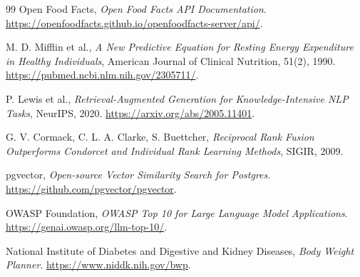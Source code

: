 \documentclass[12pt,a4paper]{report}
\begin{document}
\begin{thebibliography}{99}
Open Food Facts, \emph{Open Food Facts API Documentation}.
\url{https://openfoodfacts.github.io/openfoodfacts-server/api/}.

M. D. Mifflin et al., \emph{A New Predictive Equation for Resting Energy
Expenditure in Healthy Individuals}, American Journal of Clinical Nutrition,
51(2), 1990. \url{https://pubmed.ncbi.nlm.nih.gov/2305711/}.

P. Lewis et al., \emph{Retrieval-Augmented Generation for Knowledge-Intensive
NLP Tasks}, NeurIPS, 2020. \url{https://arxiv.org/abs/2005.11401}.

G. V. Cormack, C. L. A. Clarke, S. Buettcher, \emph{Reciprocal Rank Fusion
Outperforms Condorcet and Individual Rank Learning Methods}, SIGIR, 2009.

pgvector, \emph{Open-source Vector Similarity Search for Postgres}.
\url{https://github.com/pgvector/pgvector}.

OWASP Foundation, \emph{OWASP Top 10 for Large Language Model Applications}.
\url{https://genai.owasp.org/llm-top-10/}.

National Institute of Diabetes and Digestive and Kidney Diseases,
\emph{Body Weight Planner}. \url{https://www.niddk.nih.gov/bwp}.
\end{thebibliography}
\end{document}
